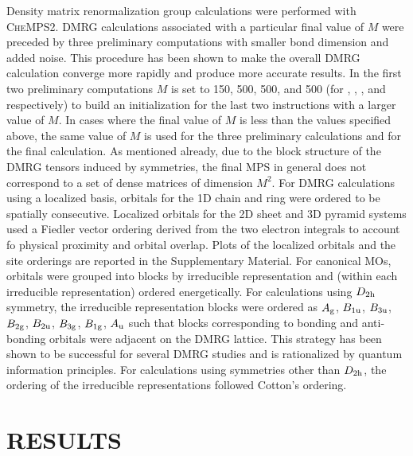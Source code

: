 \documentclass[aip,jcp,amsmath,amssymb, reprint]{revtex4-1}
\begin{document}
Density matrix renormalization group calculations were performed with \textsc{CheMPS2}.\cite{Wouters2014Chemps2}
DMRG calculations associated with a particular final value of $M$ were preceded by three preliminary computations with smaller bond dimension and added noise. 
This procedure has been shown to make the overall DMRG calculation converge more rapidly and produce more accurate results.\cite{Chan2002HighlyCorrelated, Moritz2006ConstructionOf}   
In the first two preliminary computations $M$ is set to 150, 500, 500, and 500 (for , , , and  respectively) to build an initialization for the last two instructions with a larger value of $M$. 
In cases where the final value of $M$ is less than the values specified above, the same value of $M$ is used for the three preliminary calculations and for the final calculation.
As mentioned already, due to the block structure of the DMRG tensors induced by symmetries, the final MPS in general does not correspond to a set of dense matrices of dimension $M^2$.
For DMRG calculations using a localized basis, orbitals for the 1D chain and ring were ordered to be spatially consecutive.  
Localized orbitals for the 2D sheet and 3D pyramid systems used a Fiedler vector ordering derived from the two electron integrals to account fo physical proximity and orbital overlap.\cite{Olivares2015TheAbinitio}
Plots of the localized orbitals and the site orderings are reported in the Supplementary Material.
For canonical MOs, orbitals were grouped into blocks by irreducible representation and (within each irreducible representation) ordered energetically.
For calculations using $D_{\rm{2h}}$ symmetry, the irreducible representation blocks were ordered as $A_{\rm g}$, $B_{\rm  1u}$, $B_{\rm  3u}$, $B_{\rm  2g}$, $B_{\rm  2u}$, $B_{\rm  3g}$,  $B_{\rm 1g}$, $A_{\rm  u}$ such that blocks corresponding to bonding and anti-bonding orbitals were adjacent on the DMRG lattice.  
This strategy has been shown to be successful for several DMRG studies\cite{Yanai2010MultireferenceQuantum, Kurashige2009HighPerformance, Barcza2011QuantumInfromation, Boguslawski2012EntanglementMeasures} and is rationalized by quantum information principles.\cite{Rissler2006MeasuringOrbital} 
For calculations using symmetries other than $D_{\rm{2h}}$, the ordering of the irreducible representations followed Cotton's ordering.



\section{RESULTS}
\label{sec:results}
\end{document}

